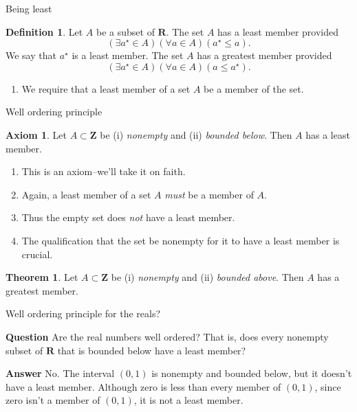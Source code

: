 \documentclass[fleqn]{beamer}
\newcommand{\reals}{\mathbf{R}}
\newcommand{\integers}{\mathbf{Z}}
\theoremstyle{definition}
\newtheorem{mydef}{Definition}
\newtheorem{myth}{Theorem}
\newtheorem{myaxiom}{Axiom}
\newenvironment{numberlist}
   {\begin{enumerate}[(1)]
       \addtolength{\itemsep}{-0.5\itemsep}}
     {\end{enumerate}}
\begin{document}
\begin{frame}{Being least}
\begin{mydef} Let \(A\) be a subset of \(\reals\). The set \(A\) has a least
  member provided
  \[
     \left (\exists a^\star \in A \right) \left( \forall a \in A \right)
     (a^\star \leq a).
  \]
  We say that \(a^\star\) is a least member.  The set \(A\) has a greatest 
  member provided
  \[
     \left (\exists a^\star \in A \right) \left( \forall a \in A \right)
     (a \leq a^\star).
  \]
  \end{mydef} 


\begin{numberlist}
 \item We require that a least member of a set \(A\) be a member of the set.
\end{numberlist}

\end{frame}



\begin{frame}{Well ordering principle}

\begin{myaxiom} Let \(A \subset \integers\) be (i) \emph{nonempty} and (ii) \emph{bounded below}. Then \(A\) has a least member.
\end{myaxiom}

\begin{numberlist}

\item This is an axiom--we'll take it on faith.

\item Again, a least member of a set \(A\) \emph{must} be a member of \(A\).

\item Thus the empty set does \emph{not} have a least member.

\item The qualification that the set be nonempty for it to have a least member is crucial.

\end{numberlist}


\begin{myth} Let \(A \subset \integers\) be (i) \emph{nonempty} and (ii) \emph{bounded above}. Then \(A\) has a greatest  member.
\end{myth}

\end{frame}
\begin{frame}{Well ordering principle for the reals?}

\textbf{Question} Are the real numbers well ordered?  That is, does every nonempty subset of \(\reals\) that is bounded below have a least member?

\vspace{0.5in}
\textbf{Answer} No. The interval \((0,1)\) is nonempty and  bounded below, but it doesn't have a least member. Although zero is less than
every member of \((0,1)\), since zero isn't a member of \((0,1)\), it is not a least member.

\end{frame}
\end{document}
